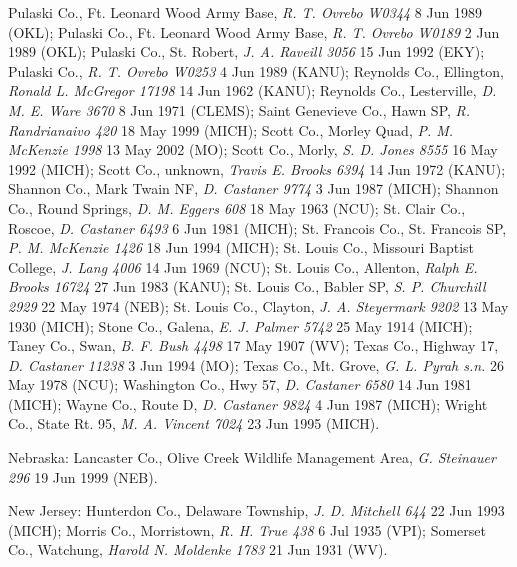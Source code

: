 \documentclass{article}
\begin{document}
Pulaski Co., Ft. Leonard Wood Army Base, \textit{R. T. Ovrebo W0344} 8 Jun 1989 (OKL);
Pulaski Co., Ft. Leonard Wood Army Base, \textit{R. T. Ovrebo W0189} 2 Jun 1989 (OKL);
Pulaski Co., St. Robert, \textit{J. A. Raveill 3056} 15 Jun 1992 (EKY);
Pulaski Co., \textit{R. T. Ovrebo W0253} 4 Jun 1989 (KANU);
Reynolds Co., Ellington, \textit{Ronald L. McGregor 17198} 14 Jun 1962 (KANU);
Reynolds Co., Lesterville, \textit{D. M. E. Ware 3670} 8 Jun 1971 (CLEMS);
Saint Genevieve Co., Hawn SP, \textit{R. Randrianaivo 420} 18 May 1999 (MICH);
Scott Co., Morley Quad, \textit{P. M. McKenzie 1998} 13 May 2002 (MO);
Scott Co., Morly, \textit{S. D. Jones 8555} 16 May 1992 (MICH);
Scott Co., unknown, \textit{Travis E. Brooks 6394} 14 Jun 1972 (KANU);
Shannon Co., Mark Twain NF, \textit{D. Castaner 9774} 3 Jun 1987 (MICH);
Shannon Co., Round Springs, \textit{D. M. Eggers 608} 18 May 1963 (NCU);
St. Clair Co., Roscoe, \textit{D. Castaner 6493} 6 Jun 1981 (MICH);
St. Francois Co., St. Francois SP, \textit{P. M. McKenzie 1426} 18 Jun 1994 (MICH);
St. Louis Co., Missouri Baptist College, \textit{J. Lang 4006} 14 Jun 1969 (NCU);
St. Louis Co., Allenton, \textit{Ralph E. Brooks 16724} 27 Jun 1983 (KANU);
St. Louis Co., Babler SP, \textit{S. P. Churchill 2929} 22 May 1974 (NEB);
St. Louis Co., Clayton, \textit{J. A. Steyermark 9202} 13 May 1930 (MICH);
Stone Co., Galena, \textit{E. J. Palmer 5742} 25 May 1914 (MICH);
Taney Co., Swan, \textit{B. F. Bush 4498} 17 May 1907 (WV);
Texas Co., Highway 17, \textit{D. Castaner 11238} 3 Jun 1994 (MO);
Texas Co., Mt. Grove, \textit{G. L. Pyrah s.n.} 26 May 1978 (NCU);
Washington Co.,  Hwy 57, \textit{D. Castaner 6580} 14 Jun 1981 (MICH);
Wayne Co., Route D, \textit{D. Castaner 9824} 4 Jun 1987 (MICH);
Wright Co.,  State Rt. 95, \textit{M. A. Vincent 7024} 23 Jun 1995 (MICH).

Nebraska:
Lancaster Co., Olive Creek Wildlife Management Area, \textit{G. Steinauer 296} 19 Jun 1999 (NEB).

New Jersey:
Hunterdon Co., Delaware Township, \textit{J. D. Mitchell 644} 22 Jun 1993 (MICH);
Morris Co., Morristown, \textit{R. H. True 438} 6 Jul 1935 (VPI);
Somerset Co., Watchung, \textit{Harold N. Moldenke 1783} 21 Jun 1931 (WV).
\end{document}
